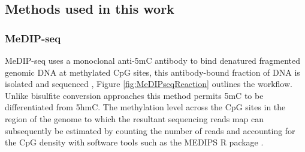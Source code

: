 \documentclass[]{book}
\begin{document}
\hypertarget{methods-used-in-this-work}{%
\subsection{Methods used in this work}\label{methods-used-in-this-work}}

\hypertarget{MeDIPseq}{%
\subsubsection{MeDIP-seq}\label{MeDIPseq}}

MeDIP-seq uses a monoclonal anti-5mC antibody to bind denatured fragmented genomic DNA at methylated CpG sites, this antibody-bound fraction of DNA is isolated and sequenced \citep{Down2009}, Figure \ref{fig:MeDIPseqReaction} outlines the workflow. Unlike bisulfite conversion approaches this method permits 5mC to be differentiated from 5hmC. The methylation level across the CpG sites in the region of the genome to which the resultant sequencing reads map can subsequently be estimated by counting the number of reads and accounting for the CpG density with software tools such as the MEDIPS R package \citep{Lienhard2014}.
\end{document}

